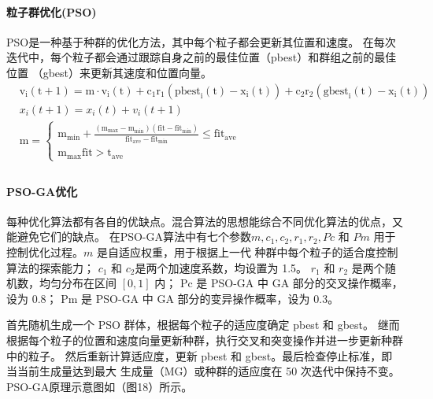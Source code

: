 \documentclass{article}
\numberwithin{equation}{subsection}
\begin{document}
\paragraph{粒子群优化(PSO)}
PSO是一种基于种群的优化方法，其中每个粒子都会更新其位置和速度。
在每次迭代中，每个粒子都会通过跟踪自身之前的最佳位置（pbest）和群组之前的最佳位置
（gbest）来更新其速度和位置向量。
\begin{equation}
    \begin{aligned}
    & \mathrm{v}_{\mathrm{i}}(\mathrm{t}+1)=\mathrm{m} \cdot \mathrm{v}_{\mathrm{i}}(\mathrm{t})+\mathrm{c}_1 \mathrm{r}_1\left(\text {pbest}_{\mathrm{i}}(\mathrm{t})-\mathrm{x}_{\mathrm{i}}(\mathrm{t})\right)+\mathrm{c}_2 \mathrm{r}_2\left(\text {gbest}_{\mathrm{i}}(\mathrm{t})-\mathrm{x}_{\mathrm{i}}(\mathrm{t})\right) \\
    & x_i(t+1)=x_i(t)+v_i(t+1) \\
    & \mathrm{m}=\left\{\begin{array}{l}
    \mathrm{m}_{\min }+\frac{\left(\mathrm{m}_{\max }-\mathrm{m}_{\min }\right)\left(\mathrm{fit}-\mathrm{fit}_{\min }\right)}{\text {fit}_{\text {ave}}-\mathrm{fit}_{\min }}\leq \text {fit}_{\text {ave}} \\
    \mathrm{m}_{\max } \text {fit}>\mathrm{t}_{\text {ave}}
    \end{array}\right. \\
    \end{aligned}
\end{equation}

\paragraph{PSO-GA优化}
每种优化算法都有各自的优缺点。混合算法的思想能综合不同优化算法的优点，又能避免它们的缺点。\cite{8}
在PSO-GA算法中有七个参数$ m,c_1 ,c_2 ,r_1 ,r_2 ,Pc$ 和 $Pm$ 用于控制优化过程。$m$ 是自适应权重，用于根据上一代
种群中每个粒子的适合度控制算法的探索能力；
$c_1$ 和 $c_2$是两个加速度系数，均设置为 1.5。
$r_1$ 和 $r_2$ 是两个随机数，均匀分布在区间 $[0, 1]$ 内；
Pc 是 PSO-GA 中 GA 部分的交叉操作概率，设为 $0.8$；
Pm 是 PSO-GA 中 GA 部分的变异操作概率，设为 0.3。

\noindent
首先随机生成一个 PSO 群体，根据每个粒子的适应度确定 pbest 和 gbest。
继而根据每个粒子的位置和速度向量更新种群，执行交叉和突变操作并进一步更新种群中的粒子。
然后重新计算适应度，更新 pbest 和 gbest。最后检查停止标准，即当当前生成量达到最大
生成量（MG）或种群的适应度在 50 次迭代中保持不变。PSO-GA原理示意图如（图18）所示。
\end{document}
